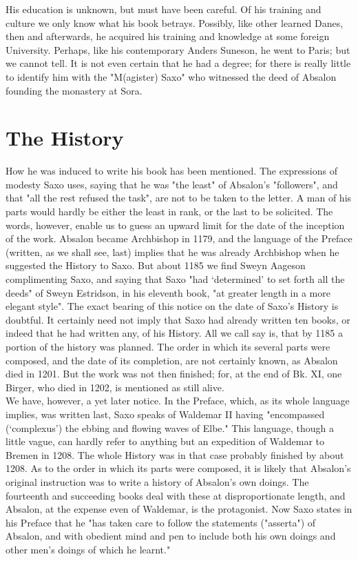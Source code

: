 \documentclass[10pt,a4paper]{report}
\begin{document}
His education is unknown, but must have been careful. Of his training and culture we only know what his book betrays. Possibly, like other learned Danes, then and afterwards, he acquired his training and knowledge at some foreign University. Perhaps, like his contemporary Anders Suneson, he went to Paris; but we cannot tell. It is not even certain that he had a degree; for there is really little to identify him with the "M(agister) Saxo" who witnessed the deed of Absalon founding the monastery at Sora.\\

\chapter{The History}
How he was induced to write his book has been mentioned. The expressions of modesty Saxo uses, saying that he was "the least" of Absalon's "followers", and that "all the rest refused the task", are not to be taken to the letter. A man of his parts would hardly be either the least in rank, or the last to be solicited. The words, however, enable us to guess an upward limit for the date of the inception of the work. Absalon became Archbishop in 1179, and the language of the Preface (written, as we shall see, last) implies that he was already Archbishop when he suggested the History to Saxo. But about 1185 we find Sweyn Aageson complimenting Saxo, and saying that Saxo "had `determined' to set forth all the deeds" of Sweyn Estridson, in his eleventh book, "at greater length in a more elegant style". The exact bearing of this notice on the date of Saxo's History is doubtful. It certainly need not imply that Saxo had already written ten books, or indeed that he had written any, of his History. All we call say is, that by 1185 a portion of the history was planned. The order in which its several parts were composed, and the date of its completion, are not certainly known, as Absalon died in 1201. But the work was not then finished; for, at the end of Bk. XI, one Birger, who died in 1202, is mentioned as still alive.\\

We have, however, a yet later notice. In the Preface, which, as its whole language implies, was written last, Saxo speaks of Waldemar II having "encompassed (`complexus') the ebbing and flowing waves of Elbe." This language, though a little vague, can hardly refer to anything but an expedition of Waldemar to Bremen in 1208. The whole History was in that case probably finished by about 1208. As to the order in which its parts were composed, it is likely that Absalon's original instruction was to write a history of Absalon's own doings. The fourteenth and succeeding books deal with these at disproportionate length, and Absalon, at the expense even of Waldemar, is the protagonist. Now Saxo states in his Preface that he "has taken care to follow the statements ("asserta") of Absalon, and with obedient mind and pen to include both his own doings and other men's doings of which he learnt."\\
\end{document}
